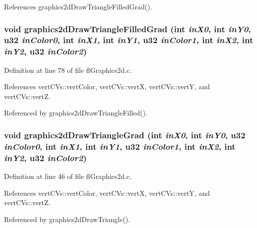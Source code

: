 References graphics2d\-Draw\-Triangle\-Filled\-Grad().
\subsubsection{\setlength{\rightskip}{0pt plus 5cm}void graphics2d\-Draw\-Triangle\-Filled\-Grad (int {\em in\-X0}, int {\em in\-Y0}, u32 {\em in\-Color0}, int {\em in\-X1}, int {\em in\-Y1}, u32 {\em in\-Color1}, int {\em in\-X2}, int {\em in\-Y2}, u32 {\em in\-Color2})}\label{flGraphics2d_8h_503a127802567b2d5d3ead8d2281ed56}




Definition at line 78 of file fl\-Graphics2d.c.

References vert\-CVs::vert\-Color, vert\-CVs::vert\-X, vert\-CVs::vert\-Y, and vert\-CVs::vert\-Z.

Referenced by graphics2d\-Draw\-Triangle\-Filled().
\subsubsection{\setlength{\rightskip}{0pt plus 5cm}void graphics2d\-Draw\-Triangle\-Grad (int {\em in\-X0}, int {\em in\-Y0}, u32 {\em in\-Color0}, int {\em in\-X1}, int {\em in\-Y1}, u32 {\em in\-Color1}, int {\em in\-X2}, int {\em in\-Y2}, u32 {\em in\-Color2})}\label{flGraphics2d_8h_b0897647bc7e2d680962b311b2882eef}




Definition at line 46 of file fl\-Graphics2d.c.

References vert\-CVs::vert\-Color, vert\-CVs::vert\-X, vert\-CVs::vert\-Y, and vert\-CVs::vert\-Z.

Referenced by graphics2d\-Draw\-Triangle().